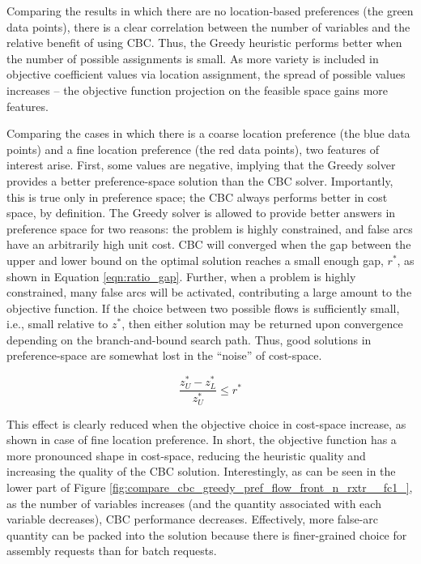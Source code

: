 Comparing the results in which there are no location-based preferences (the
green data points), there is a clear correlation between the number of variables
and the relative benefit of using CBC. Thus, the Greedy heuristic performs
better when the number of possible assignments is small. As more variety is
included in objective coefficient values via location assignment, the spread of
possible values increases -- the objective function projection on the feasible
space gains more features. 

Comparing the cases in which there is a coarse location preference (the blue
data points) and a fine location preference (the red data points), two features
of interest arise. First, some values are negative, implying that the Greedy
solver provides a better preference-space solution than the CBC
solver. Importantly, this is true only in preference space; the CBC always
performs better in cost space, by definition. The Greedy solver is allowed to
provide better answers in preference space for two reasons: the problem is
highly constrained, and false arcs have an arbitrarily high unit cost. CBC will
converged when the gap between the upper and lower bound on the optimal solution
reaches a small enough gap, $r^*$, as shown in Equation
\ref{eqn:ratio_gap}. Further, when a problem is highly constrained, many false
arcs will be activated, contributing a large amount to the objective
function. If the choice between two possible flows is sufficiently small, i.e.,
small relative to $z^*$, then either solution may be returned upon convergence
depending on the branch-and-bound search path. Thus, good solutions in
preference-space are somewhat lost in the ``noise'' of cost-space.

\begin{equation}\label{eqn:ratio_gap}
\frac{z^*_U - z^*_L}
     {z^*_U} \leq r^*
\end{equation}

This effect is clearly reduced when the objective choice in cost-space increase,
as shown in case of fine location preference. In short, the objective function
has a more pronounced shape in cost-space, reducing the heuristic quality and
increasing the quality of the CBC solution. Interestingly, as can be seen in the
lower part of Figure \ref{fig:compare_cbc_greedy_pref_flow_front_n_rxtr__fc1_},
as the number of variables increases (and the quantity associated with each
variable decreases), CBC performance decreases. Effectively, more false-arc
quantity can be packed into the solution because there is finer-grained choice
for assembly requests than for batch requests.

